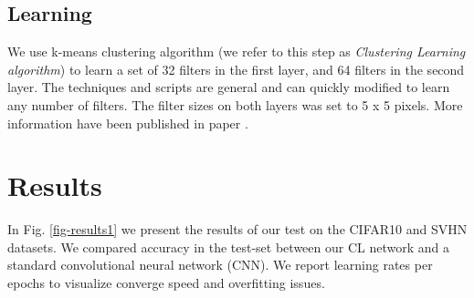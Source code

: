 \documentclass{article} %
\begin{document}
\subsection{Learning}
We use k-means clustering algorithm (we refer to this step as \textit{Clustering Learning algorithm}) to learn a set of 32 filters in the first layer, and 64 filters in the second layer. The techniques and scripts are general and can quickly modified to learn any number of filters. The filter sizes on both layers was set to 5 x 5 pixels. More information have been published in paper \cite {culurciello2013clustering}. 








\section{Results}
\label{sec-results}

In Fig. \ref{fig-results1} we present the results of our test on the CIFAR10 and SVHN datasets. We compared accuracy in the test-set between our CL network and a standard convolutional neural network (CNN). We report learning rates per epochs to visualize converge speed and overfitting issues.
\end{document}
